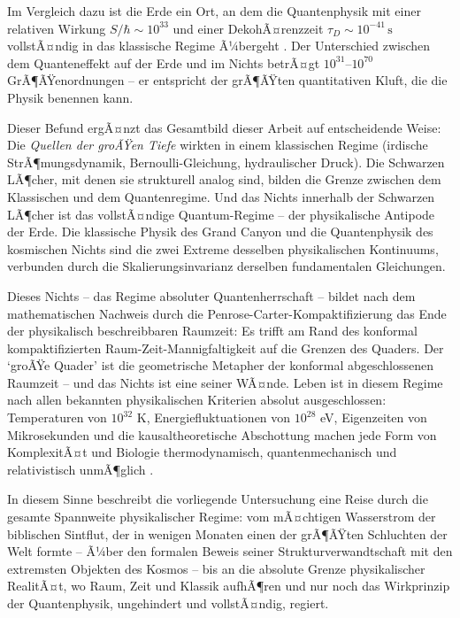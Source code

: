 ﻿\documentclass[12pt,a4paper]{report}
\begin{document}
Im Vergleich dazu ist die Erde ein Ort, an dem die Quantenphysik mit einer relativen Wirkung $S/\hbar \sim 10^{33}$ und einer DekohÃ¤renzzeit $\tau_D \sim 10^{-41}\,\text{s}$ vollstÃ¤ndig in das klassische Regime Ã¼bergeht \cite{zurek2003}. Der Unterschied zwischen dem Quanteneffekt auf der Erde und im Nichts betrÃ¤gt $10^{31}$--$10^{70}$ GrÃ¶ÃŸenordnungen -- er entspricht der grÃ¶ÃŸten quantitativen Kluft, die die Physik benennen kann.

Dieser Befund ergÃ¤nzt das Gesamtbild dieser Arbeit auf entscheidende Weise: Die \textit{Quellen der groÃŸen Tiefe} wirkten in einem klassischen Regime (irdische StrÃ¶mungsdynamik, Bernoulli-Gleichung, hydraulischer Druck). Die Schwarzen LÃ¶cher, mit denen sie strukturell analog sind, bilden die Grenze zwischen dem Klassischen und dem Quantenregime. Und das Nichts innerhalb der Schwarzen LÃ¶cher ist das vollstÃ¤ndige Quantum-Regime -- der physikalische Antipode der Erde. Die klassische Physik des Grand Canyon und die Quantenphysik des kosmischen Nichts sind die zwei Extreme desselben physikalischen Kontinuums, verbunden durch die Skalierungsinvarianz derselben fundamentalen Gleichungen.

Dieses Nichts -- das Regime absoluter Quantenherrschaft -- bildet nach dem mathematischen Nachweis durch die Penrose-Carter-Kompaktifizierung \cite{penrose2004} das Ende der physikalisch beschreibbaren Raumzeit: Es trifft am Rand des konformal kompaktifizierten Raum-Zeit-Mannigfaltigkeit auf die Grenzen des Quaders. Der `groÃŸe Quader' ist die geometrische Metapher der konformal abgeschlossenen Raumzeit -- und das Nichts ist eine seiner WÃ¤nde. Leben ist in diesem Regime nach allen bekannten physikalischen Kriterien absolut ausgeschlossen: Temperaturen von $10^{32}$ K, Energiefluktuationen von $10^{28}$ eV, Eigenzeiten von Mikrosekunden und die kausaltheoretische Abschottung machen jede Form von KomplexitÃ¤t und Biologie thermodynamisch, quantenmechanisch und relativistisch unmÃ¶glich \cite{bekenstein1973,feynman1965}.

In diesem Sinne beschreibt die vorliegende Untersuchung eine Reise durch die gesamte Spannweite physikalischer Regime: vom mÃ¤chtigen Wasserstrom der biblischen Sintflut, der in wenigen Monaten einen der grÃ¶ÃŸten Schluchten der Welt formte -- Ã¼ber den formalen Beweis seiner Strukturverwandtschaft mit den extremsten Objekten des Kosmos -- bis an die absolute Grenze physikalischer RealitÃ¤t, wo Raum, Zeit und Klassik aufhÃ¶ren und nur noch das Wirkprinzip der Quantenphysik, ungehindert und vollstÃ¤ndig, regiert.
\end{document}
